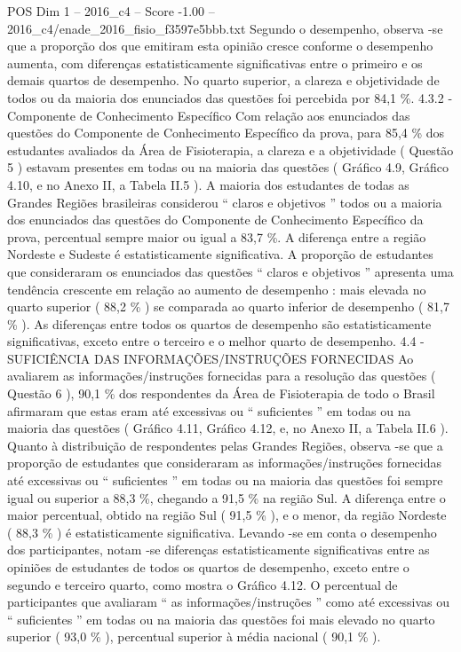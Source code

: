 \begin{textsample}{POS Dim 1 – 2016\_c4 – Score -1.00 – 2016\_c4/enade\_2016\_fisio\_f3597e5bbb.txt}
Segundo o desempenho, observa -se que a proporção dos que emitiram esta opinião cresce conforme o desempenho aumenta, com diferenças estatisticamente significativas entre o primeiro e os demais quartos de desempenho.
No quarto superior, a clareza e objetividade de todos ou da maioria dos enunciados das questões foi percebida por 84,1 \%. 4.3.2 - Componente de Conhecimento Específico Com relação aos enunciados das questões do Componente de Conhecimento Específico da prova, para 85,4 \% dos estudantes avaliados da Área de Fisioterapia, a clareza e a objetividade ( Questão 5 ) estavam presentes em todas ou na maioria das questões ( Gráfico 4.9, Gráfico 4.10, e no Anexo II, a Tabela II.5 ).
A maioria dos estudantes de todas as Grandes Regiões brasileiras considerou “ claros e objetivos ” todos ou a maioria dos enunciados das questões do Componente de Conhecimento Específico da prova, percentual sempre maior ou igual a 83,7 \%.
A diferença entre a região Nordeste e Sudeste é estatisticamente significativa.
A proporção de estudantes que consideraram os enunciados das questões “ claros e objetivos ” apresenta uma tendência crescente em relação ao aumento de desempenho : mais elevada no quarto superior ( 88,2 \% ) se comparada ao quarto inferior de desempenho ( 81,7 \% ).
As diferenças entre todos os quartos de desempenho são estatisticamente significativas, exceto entre o terceiro e o melhor quarto de desempenho. 4.4 - SUFICIÊNCIA DAS INFORMAÇÕES/INSTRUÇÕES FORNECIDAS Ao avaliarem as informações/instruções fornecidas para a resolução das questões ( Questão 6 ), 90,1 \% dos respondentes da Área de Fisioterapia de todo o Brasil afirmaram que estas eram até excessivas ou “ suficientes ” em todas ou na maioria das questões ( Gráfico 4.11, Gráfico 4.12, e, no Anexo II, a Tabela II.6 ).
Quanto à distribuição de respondentes pelas Grandes Regiões, observa -se que a proporção de estudantes que consideraram as informações/instruções fornecidas até excessivas ou “ suficientes ” em todas ou na maioria das questões foi sempre igual ou superior a 88,3 \%, chegando a 91,5 \% na região Sul.
A diferença entre o maior percentual, obtido na região Sul ( 91,5 \% ), e o menor, da região Nordeste ( 88,3 \% ) é estatisticamente significativa.
Levando -se em conta o desempenho dos participantes, notam -se diferenças estatisticamente significativas entre as opiniões de estudantes de todos os quartos de desempenho, exceto entre o segundo e terceiro quarto, como mostra o Gráfico 4.12.
O percentual de participantes que avaliaram “ as informações/instruções ” como até excessivas ou “ suficientes ” em todas ou na maioria das questões foi mais elevado no quarto superior ( 93,0 \% ), percentual superior à média nacional ( 90,1 \% ).

\end{textsample}
